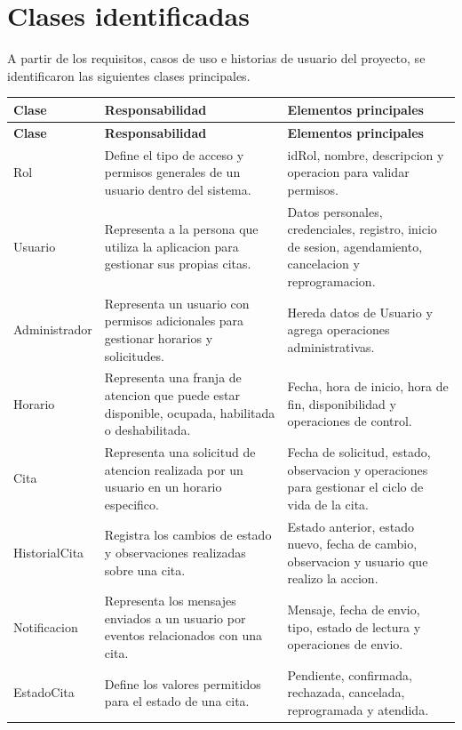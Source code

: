 \documentclass[12pt,letterpaper]{article}
\begin{document}
\section{Clases identificadas}

A partir de los requisitos, casos de uso e historias de usuario del proyecto, se identificaron las siguientes clases principales.

\begin{longtable}{|p{3.2cm}|p{5.6cm}|p{5.7cm}|}
\hline
\textbf{Clase} & \textbf{Responsabilidad} & \textbf{Elementos principales} \\
\hline
\endfirsthead
\hline
\textbf{Clase} & \textbf{Responsabilidad} & \textbf{Elementos principales} \\
\hline
\endhead
\hline
\endfoot
\hline
\endlastfoot

Rol & Define el tipo de acceso y permisos generales de un usuario dentro del sistema. & idRol, nombre, descripcion y operacion para validar permisos. \\
\hline

Usuario & Representa a la persona que utiliza la aplicacion para gestionar sus propias citas. & Datos personales, credenciales, registro, inicio de sesion, agendamiento, cancelacion y reprogramacion. \\
\hline

Administrador & Representa un usuario con permisos adicionales para gestionar horarios y solicitudes. & Hereda datos de Usuario y agrega operaciones administrativas. \\
\hline

Horario & Representa una franja de atencion que puede estar disponible, ocupada, habilitada o deshabilitada. & Fecha, hora de inicio, hora de fin, disponibilidad y operaciones de control. \\
\hline

Cita & Representa una solicitud de atencion realizada por un usuario en un horario especifico. & Fecha de solicitud, estado, observacion y operaciones para gestionar el ciclo de vida de la cita. \\
\hline

HistorialCita & Registra los cambios de estado y observaciones realizadas sobre una cita. & Estado anterior, estado nuevo, fecha de cambio, observacion y usuario que realizo la accion. \\
\hline

Notificacion & Representa los mensajes enviados a un usuario por eventos relacionados con una cita. & Mensaje, fecha de envio, tipo, estado de lectura y operaciones de envio. \\
\hline

EstadoCita & Define los valores permitidos para el estado de una cita. & Pendiente, confirmada, rechazada, cancelada, reprogramada y atendida. \\
\hline
\end{longtable}
\end{document}
